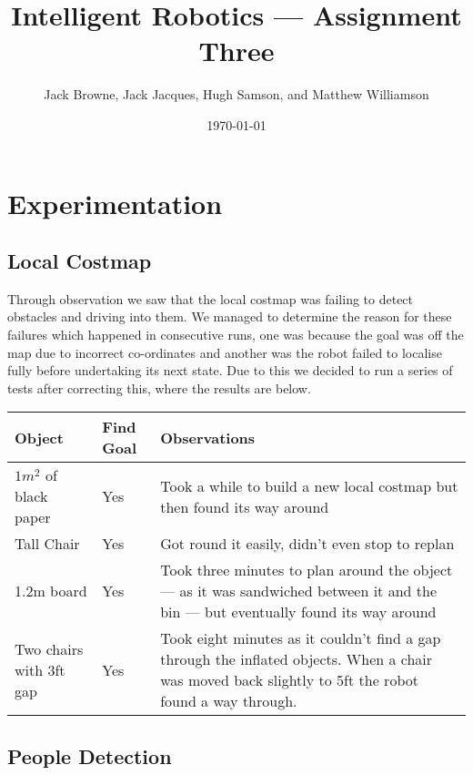 \documentclass[12pt]{article}
\begin{document}
\title{Intelligent Robotics --- Assignment Three}

\author{Jack Browne, Jack Jacques, Hugh Samson, and Matthew Williamson}
\date{\today}
\maketitle

\section{Experimentation}

\subsection{Local Costmap}
Through observation we saw that the local costmap was failing to detect obstacles and driving into them. We managed to determine the reason for these failures which happened in consecutive runs, one was because the goal was off the map due to incorrect co-ordinates and another was the robot failed to localise fully before undertaking its next state. Due to this we decided to run a series of tests after correcting this, where the results are below.

\begin{center}
\begin{tabular}{ |p{2cm}|p{1cm}|p{9cm}| } 
 \hline
 Object & Find Goal & Observations \\
 \hline
 $1m ^ 2$ of black paper & Yes & Took a while to build a new local costmap but then found its way around \\[0.3cm]
 Tall Chair & Yes & Got round it easily, didn't even stop to replan\\[0.3cm]
 1.2m board & Yes & Took three minutes to plan around the object --- as it was sandwiched between it and the bin --- but eventually found its way around\\[0.3cm]
 Two chairs with 3ft gap & Yes & Took eight minutes as it couldn't find a gap through the inflated objects. When a chair was moved back slightly to 5ft the robot found a way through.\\
 
 \hline
\end{tabular}
\end{center}

\subsection{People Detection}
\end{document}
